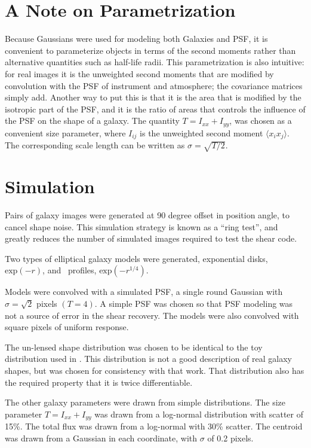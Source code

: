 \documentclass[12pt,preprint]{aastex}
\begin{document}
\section{A Note on Parametrization}

Because Gaussians were used for modeling both Galaxies and PSF, it is
convenient to parameterize objects in terms of the second moments rather than
alternative quantities such as half-life radii.  This parametrization is also
intuitive: for real images it is the unweighted second moments that are
modified by convolution with the PSF of instrument and atmosphere; the
covariance matrices simply add. Another way to put this is that it is the area
that is modified by the isotropic part of the PSF, and it is the ratio of areas
that controls the influence of the PSF on the shape of a galaxy.  The quantity
$T = I_{xx} + I_{yy}$, was chosen as a convenient size parameter, where
$I_{ij}$ is the unweighted second moment $\langle x_i x_j \rangle$.
The corresponding scale length can be written as $\sigma = \sqrt{T/2}$.

\section{Simulation} \label{sec:sim}

Pairs of galaxy images were generated at 90 degree offset in position angle, to
cancel shape noise.  This simulation strategy is known as a ``ring
test''\citep{Nakajima2007}, and greatly reduces the number of simulated images
required to test the shear code.

Two types of elliptical galaxy models were generated, exponential disks,
$\textrm{exp}(-r)$, and \devauc\ profiles, $\textrm{exp}(-r^{1/4})$.

Models were convolved with a simulated PSF, a single round Gaussian with
$\sigma = \sqrt{2}$ pixels $(T=4)$.  A simple PSF was chosen so that PSF
modeling was not a source of error in the shear recovery.  The models were also
convolved with square pixels of uniform response.

The un-lensed shape distribution was chosen to be identical to the toy
distribution used in \cite{ba13}.  This distribution is not a good description
of real galaxy shapes, but was chosen for consistency with that work.  That
distribution also has the required property that it is twice differentiable.

The other galaxy parameters were drawn from simple distributions.  The size
parameter $T=I_{xx} + I_{yy}$ was drawn from a log-normal distribution with
scatter of 15\%.  The total flux was drawn from a log-normal with 30\% scatter.
The centroid was drawn from a Gaussian in each coordinate, with $\sigma$ of 0.2
pixels.
\end{document}
